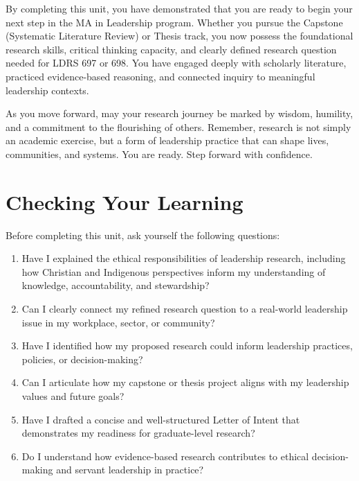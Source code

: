 \documentclass[
  letterpaper,
  DIV=11,
  numbers=noendperiod]{scrreprt}
\providecommand{\tightlist}{%
  \setlength{\itemsep}{0pt}\setlength{\parskip}{0pt}}\usepackage{longtable,booktabs,array}
\begin{document}
By completing this unit, you have demonstrated that you are ready to
begin your next step in the MA in Leadership program. Whether you pursue
the Capstone (Systematic Literature Review) or Thesis track, you now
possess the foundational research skills, critical thinking capacity,
and clearly defined research question needed for LDRS 697 or 698. You
have engaged deeply with scholarly literature, practiced evidence-based
reasoning, and connected inquiry to meaningful leadership contexts.

As you move forward, may your research journey be marked by wisdom,
humility, and a commitment to the flourishing of others. Remember,
research is not simply an academic exercise, but a form of leadership
practice that can shape lives, communities, and systems. You are ready.
Step forward with confidence.

\section*{Checking Your Learning}\label{checking-your-learning-3}


Before completing this unit, ask yourself the following questions:

\begin{enumerate}
\def\labelenumi{\arabic{enumi}.}
\tightlist
\item
  Have I explained the ethical responsibilities of leadership research,
  including how Christian and Indigenous perspectives inform my
  understanding of knowledge, accountability, and stewardship?
\item
  Can I clearly connect my refined research question to a real-world
  leadership issue in my workplace, sector, or community?
\item
  Have I identified how my proposed research could inform leadership
  practices, policies, or decision-making?
\item
  Can I articulate how my capstone or thesis project aligns with my
  leadership values and future goals?
\item
  Have I drafted a concise and well-structured Letter of Intent that
  demonstrates my readiness for graduate-level research?
\item
  Do I understand how evidence-based research contributes to ethical
  decision-making and servant leadership in practice?
\end{enumerate}
\end{document}
